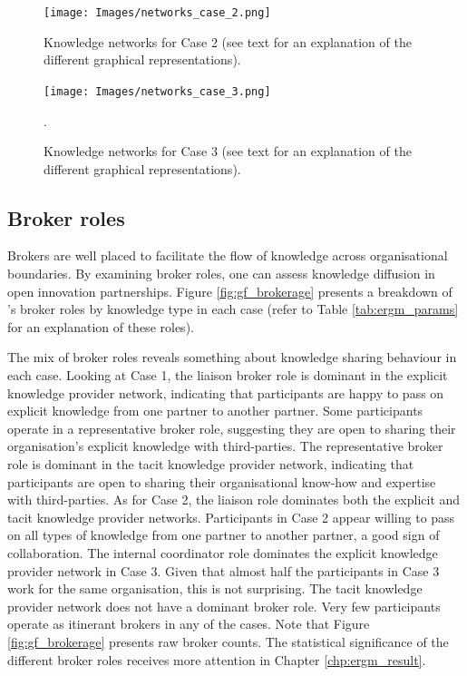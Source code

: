 \begin{figure}
\texttt{[image: Images/networks\_case\_2.png]}
\caption[Knowledge networks for Case 2]{Knowledge networks for Case 2 (see text for an explanation of the different graphical representations).}
\label{fig:network_case_2} 
\end{figure}

\begin{figure}
\texttt{[image: Images/networks\_case\_3.png]}
\caption[Knowledge networks for Case 3]{Knowledge networks for Case 3 (see text for an explanation of the different graphical representations).}. 
\label{fig:network_case_3} 
\end{figure}

\subsection{Broker roles}

Brokers are well placed to facilitate the flow of knowledge across organisational boundaries. By examining broker roles, one can assess knowledge diffusion in open innovation partnerships. Figure \ref{fig:gf_brokerage} presents a breakdown of \citeauthor{gould1989structures}'s \citeyearpar{gould1989structures} broker roles by knowledge type in each case (refer to Table \ref{tab:ergm_params} for an explanation of these roles).  \medskip

The mix of broker roles reveals something about knowledge sharing behaviour in each case. Looking at Case 1, the liaison broker role is dominant in the explicit knowledge provider network, indicating that participants are happy to pass on explicit knowledge from one partner to another partner. Some participants operate in a representative broker role, suggesting they are open to sharing their organisation's explicit knowledge with third-parties. The representative broker role is dominant in the tacit knowledge provider network, indicating that participants are open to sharing their organisational know-how and expertise with third-parties. As for Case 2, the liaison role dominates both the explicit and tacit knowledge provider networks. Participants in Case 2 appear willing to pass on all types of knowledge from one partner to another partner, a good sign of collaboration. The internal coordinator role dominates the explicit knowledge provider network in Case 3. Given that almost half the participants in Case 3 work for the same organisation, this is not surprising. The tacit knowledge provider network does not have a dominant broker role. Very few participants operate as itinerant brokers in any of the cases. Note that Figure \ref{fig:gf_brokerage} presents raw broker counts. The statistical significance of the different broker roles receives more attention in Chapter \ref{chp:ergm_result}. \medskip

